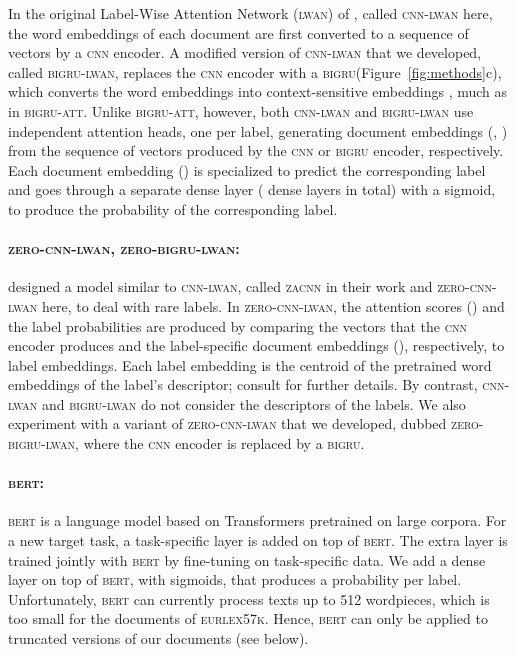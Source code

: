 \documentclass[11pt,a4paper]{article}
\newcommand{\bigruatt}{\textsc{bigru-att}\xspace}
\newcommand{\bigru}{\textsc{bigru}\xspace}
\newcommand{\cnn}{\textsc{cnn}\xspace}
\newcommand{\zacnn}{\textsc{zacnn}\xspace}
\newcommand{\lwan}{\textsc{lwan}\xspace}
\newcommand{\lwancnn}{\textsc{cnn-lwan}\xspace}
\newcommand{\zlwancnn}{\textsc{zero-cnn-lwan}\xspace}
\newcommand{\lwangru}{\textsc{bigru-lwan}\xspace}
\newcommand{\zlwangru}{\textsc{zero-bigru-lwan}\xspace}
\newcommand{\bert}{\textsc{bert}\xspace}
\newcommand{\newdata}{\textsc{eurlex57k}\xspace}
\begin{document}
In the original Label-Wise Attention Network (\lwan) of \citet{Mullenbach2018}, called \lwancnn here, the word embeddings of each document are first converted to a sequence of vectors  by a \cnn encoder.  A modified version of \lwancnn that we developed, called \lwangru, replaces the \cnn encoder with a \bigru (Figure~\ref{fig:methods}c), which converts the word embeddings into context-sensitive embeddings , much as in \bigruatt. Unlike \bigruatt, however, both \lwancnn and \lwangru use  independent attention heads, one per label, generating  document embeddings (, ) from the sequence of vectors  produced by the \cnn or \bigru encoder, respectively. Each document embedding () is specialized to predict the corresponding label and goes through a separate dense layer ( dense layers in total) with a sigmoid, to produce the probability of the corresponding label.

\paragraph{\zlwancnn, \zlwangru:}
\citet{Rios2018-2} designed a model similar to \lwancnn, called \zacnn in their work and \zlwancnn here, to deal with rare labels. In \zlwancnn, the attention scores () and the label probabilities are produced by comparing the  vectors that the \cnn encoder produces and the label-specific document embeddings (), respectively, to label embeddings. Each label embedding is the centroid of the pretrained word embeddings of the label's descriptor; consult \citet{Rios2018-2} for further details. By contrast, \lwancnn and \lwangru do not consider the descriptors of the labels. We also experiment with a variant of \zlwancnn that we developed, dubbed \zlwangru, where the \cnn encoder is replaced by a \bigru.

\paragraph{\bert:} 
\bert \citep{bert} is a language model based on Transformers \citep{Vaswani2017} pretrained on large corpora. 
For a new target task, a task-specific layer is added on top of \textsc{bert}. The extra layer is trained jointly with \textsc{bert} by fine-tuning on task-specific data. We add a dense layer on top of \textsc{bert}, with sigmoids, that produces a probability per label. Unfortunately, \bert can currently process texts up to 512 wordpieces, which is too small for the documents of \newdata. Hence, \bert can only be applied to truncated versions of our documents (see below). 
\end{document}
